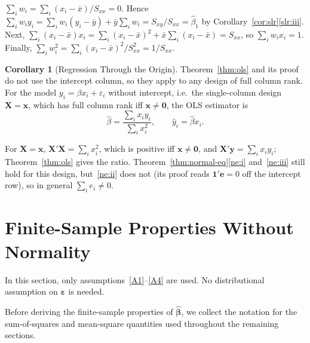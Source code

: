 \documentclass[12pt,a4paper]{article}
\makeatletter
\theoremstyle{definition}
\newtheorem{corollary}[theorem]{Corollary}
\renewenvironment{proof}[1][\proofname]{\par
  \pushQED{\qed}%
  \normalfont \topsep6\p@\@plus6\p@\relax
  \trivlist
  \item[\hskip\labelsep\bfseries #1\@addpunct{.}]\ignorespaces
}{%
  \popQED\endtrivlist\@endpefalse
}
\newcommand{\bX}{\mathbf{X}}
\newcommand{\by}{\mathbf{y}}
\newcommand{\bx}{\mathbf{x}}
\def\bb{\boldsymbol{\beta}}
\newcommand{\be}{\boldsymbol{\varepsilon}}
\newcommand{\bone}{\mathbf{1}}
\newcommand{\bzero}{\mathbf{0}}
\makeatother
\begin{document}
\begin{proof}
$\sum_i w_i = \sum_i (x_i - \bar x)/S_{xx} = 0$. Hence $\sum_i w_iy_i = \sum_i w_i(y_i - \bar y) + \bar y\sum_i w_i = S_{xy}/S_{xx} = \hat\beta_1$ by Corollary~\ref{cor:slr}\ref{slr:iii}. Next, $\sum_i (x_i - \bar x)x_i = \sum_i (x_i - \bar x)^2 + \bar x\sum_i(x_i - \bar x) = S_{xx}$, so $\sum_i w_ix_i = 1$. Finally, $\sum_i w_i^2 = \sum_i (x_i - \bar x)^2/S_{xx}^2 = 1/S_{xx}$.
\end{proof}

\begin{corollary}[Regression Through the Origin]\label{cor:origin}
Theorem~\ref{thm:ols} and its proof do not use the intercept column, so they apply to any design of full column rank. For the model $y_i = \beta x_i + \varepsilon_i$ without intercept, i.e.\ the single-column design $\bX = \bx$, which has full column rank iff $\bx \neq \bzero$, the OLS estimator is
\[
\hat\beta = \frac{\sum_i x_iy_i}{\sum_i x_i^2}, \qquad \hat y_i = \hat\beta x_i.
\]
\end{corollary}

\begin{proof}
For $\bX = \bx$, $\bX'\bX = \sum_i x_i^2$, which is positive iff $\bx \neq \bzero$, and $\bX'\by = \sum_i x_iy_i$; Theorem~\ref{thm:ols} gives the ratio. Theorem~\ref{thm:normal-eq}\ref{ne:i} and~\ref{ne:iii} still hold for this design, but~\ref{ne:ii} does not (its proof reads $\bone'\mathbf{e} = 0$ off the intercept row), so in general $\sum_i e_i \neq 0$.
\end{proof}

\section{Finite-Sample Properties Without Normality}\label{sec:finite}

In this section, only assumptions~\ref{A1}--\ref{A4} are used. No distributional assumption on $\be$ is needed.

Before deriving the finite-sample properties of $\hat{\bb}$, we collect the notation for the sum-of-squares and mean-square quantities used throughout the remaining sections.
\end{document}
